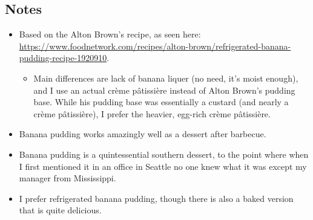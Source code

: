 \begin{multicols}{2}
\subsection*{Notes}
\begin{itemize}
    \item Based on the Alton Brown's recipe, as seen here: \url{https://www.foodnetwork.com/recipes/alton-brown/refrigerated-banana-pudding-recipe-1920910}.
    \begin{itemize}
        \item Main differences are lack of banana liquer (no need, it's moist enough), and I use an actual crème pâtissière instead of Alton Brown's pudding base. While his pudding base was essentially a custard (and nearly a crème pâtissière), I prefer the heavier, egg-rich crème pâtissière.
    \end{itemize}
    \item Banana pudding works amazingly well as a dessert after barbecue.
    \item Banana pudding is a quintessential southern dessert, to the point where when I first mentioned it in an office in Seattle no one knew what it was except my manager from Mississippi.
    \item I prefer refrigerated banana pudding, though there is also a baked version that is quite delicious.
\end{itemize}
\end{multicols}
\clearpage